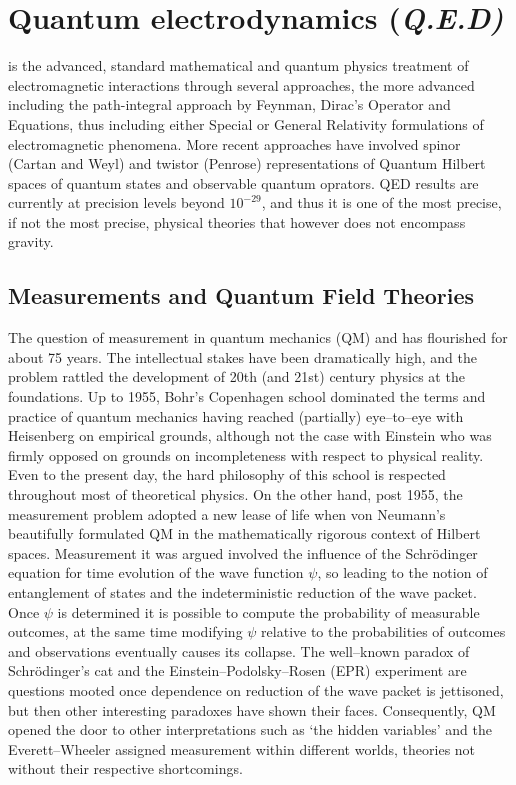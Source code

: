 \documentclass[12pt]{article}
\begin{document}
\section{Quantum electrodynamics (\em Q.E.D)}
 is the advanced, standard mathematical and quantum physics treatment of electromagnetic interactions through several approaches, the more advanced including the path-integral approach by Feynman, Dirac's Operator and  Equations, thus including either Special or General Relativity formulations of electromagnetic phenomena. More recent approaches have involved spinor (Cartan and Weyl) and twistor (Penrose) representations of Quantum Hilbert spaces of quantum states and observable quantum oprators. QED results are currently at precision levels 
beyond $10^{-29}$, and thus it is one of the most precise, if not the most precise, physical theories
that however does not encompass gravity. 

\subsection{Measurements and Quantum Field Theories}
The question of measurement in quantum mechanics (QM) and
has flourished for about 75 years. The intellectual stakes have been dramatically high, and the problem 
rattled the development of 20th (and 21st) century physics at the 
foundations. Up to 1955, Bohr's Copenhagen school dominated the 
terms and practice of quantum mechanics having reached (partially) 
eye--to--eye with Heisenberg on empirical grounds, although not the 
case with Einstein who was firmly opposed on grounds on 
incompleteness with respect to physical reality. Even to the
present day, the hard philosophy of this school is respected
throughout most of theoretical physics. On the other hand, post
1955, the measurement problem adopted a new lease of life when von
Neumann's beautifully formulated QM in the mathematically rigorous
context of Hilbert spaces. Measurement it was argued involved the
influence of the Schr\"odinger equation for time evolution of the
wave function $\psi$, so leading to the notion of entanglement of
states and the indeterministic reduction of the wave packet. Once
$\psi$ is determined it is possible to compute the probability of
measurable outcomes, at the same time modifying $\psi$ relative to
the probabilities of outcomes and observations eventually causes
its collapse. The well--known paradox of Schr\"odinger's cat and
the Einstein--Podolsky--Rosen (EPR) experiment are questions
mooted once dependence on reduction of the wave packet is
jettisoned, but then other interesting paradoxes have shown their
faces. Consequently, QM opened the door to other interpretations
such as `the hidden variables' and the Everett--Wheeler assigned
measurement within different worlds, theories not without their
respective shortcomings.
\end{document}
